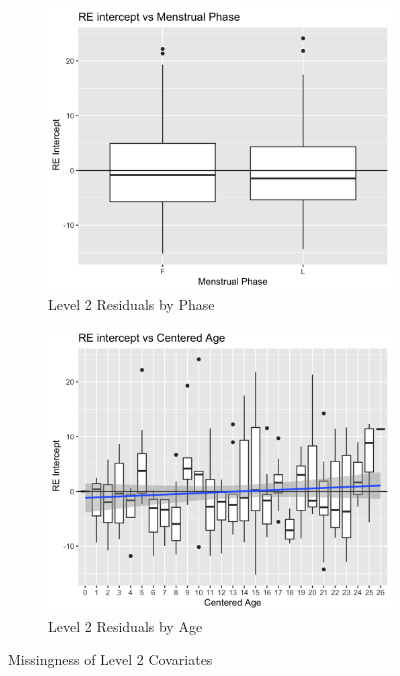 \documentclass[12pt,twoside,letterpaper]{article}
\theoremstyle{definition}
\theoremstyle{definition}
\begin{document}
    \begin{figure}[H] 
        \centering
        \begin{subfigure}[b]{0.39\textwidth}
        \centering
        \includegraphics[width=\textwidth]{pics/ri phase.png}
        \caption[]%
        {{\small Level 2 Residuals by Phase}}
        \label{fig: miss phase}
        \end{subfigure}
        \hfill
        \begin{subfigure}[b]{0.39\textwidth}
        \centering
        \includegraphics[width=\textwidth]{pics/ri age.png}
        \caption[]%
        {{\small Level 2 Residuals by Age}}
        \label{fig: miss age}
        \end{subfigure}
        \caption[]
        {\small Missingness of Level 2 Covariates}
        \label{fig: miss lv2}
        \end{figure}
    
\end{document}
